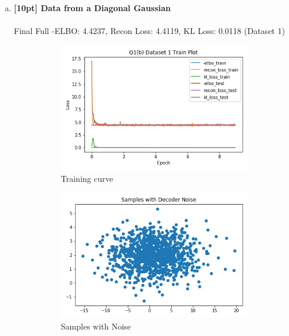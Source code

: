 \documentclass{article}
\begin{document}
\begin{enumerate}[(a)]
\item {\bf [10pt] Data from a Diagonal Gaussian} \\\\
Final Full -ELBO: 4.4237, Recon Loss: 4.4119, KL Loss: 0.0118 (Dataset 1)
\begin{figure}[H]
    \centering
    \begin{subfigure}{0.32\textwidth}
        \centering
        \includegraphics[width=\textwidth]{figures/q1_b_dset1_train_plot.png}
        \caption{Training curve}
    \end{subfigure}
    \begin{subfigure}{0.32\textwidth}
        \centering
        \includegraphics[width=\textwidth]{figures/q1_b_dset1_sample_with_noise.png}
        \caption{Samples with Noise}
    \end{subfigure}
    \begin{subfigure}{0.32\textwidth}

\end{subfigure}
\end{figure}
\end{enumerate}
\end{document}
